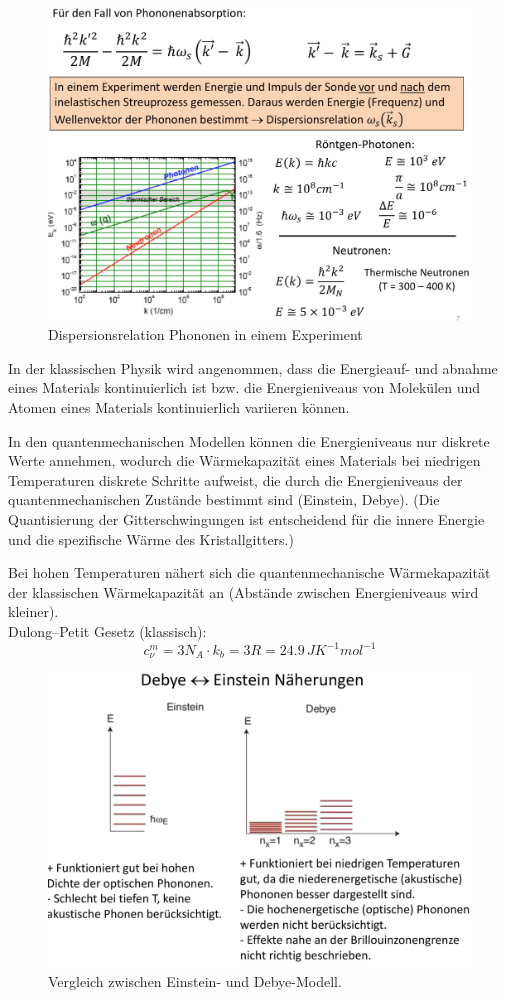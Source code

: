 \begin{figure}[H]  
    \centering
    \includegraphics[width=.8\textwidth]{resources/05-01-2015/Frage6_2.png}
    \caption{Dispersionsrelation Phononen in einem Experiment}
\end{figure}

\label{q:7}

In der klassischen Physik wird angenommen, dass die Energieauf- und abnahme eines Materials 
kontinuierlich ist bzw. die Energieniveaus von Molekülen und Atomen eines Materials kontinuierlich 
variieren können.

In den quantenmechanischen Modellen können die Energieniveaus nur diskrete Werte annehmen, wodurch die 
Wärmekapazität eines Materials bei niedrigen Temperaturen diskrete Schritte 
aufweist, die durch die Energieniveaus der quantenmechanischen Zustände bestimmt sind (Einstein, Debye).
(Die Quantisierung der Gitterschwingungen ist entscheidend für die innere Energie und
die spezifische Wärme des Kristallgitters.)

Bei hohen Temperaturen nähert sich die quantenmechanische Wärmekapazität der klassischen Wärmekapazität 
an (Abstände zwischen Energieniveaus wird kleiner).\\

Dulong--Petit Gesetz (klassisch):
\[c_\nu^m = 3 N_A\cdot k_b = 3R = 24.9 \,JK^{-1} mol^{-1}\]

\begin{figure}[H]  
    \centering
    \includegraphics[width=.8\textwidth]{resources/05-01-2015/Frage7.png}
    \caption{Vergleich zwischen Einstein- und Debye-Modell.}
\end{figure}

